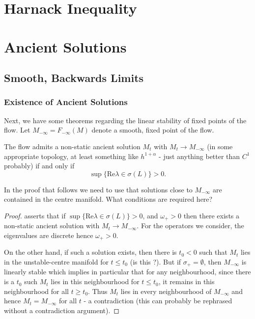 \documentclass{amsart}
\begin{document}
\section{Harnack Inequality}
\label{sec:harnack}


\section{Ancient Solutions}
\label{sec:ancient_solutions}

\subsection{Smooth, Backwards Limits}
\label{subsec:smooth_backwards_limits}

\subsubsection{Existence of Ancient Solutions}
\label{subsubsec:smooth_ancient_existence}

Next, we have some theorems regarding the linear stability of fixed points of the flow. Let \(M_{-\infty} = F_{-\infty}(M)\) denote a smooth, fixed point of the flow.

\begin{thm}
The flow admits a non-static ancient solution \(M_t\) with \(M_t \to M_{-\infty}\) (in some appropriate topology, at least something like \(h^{1+\alpha}\) - just anything better than \(C^1\) probably) if and only if
\[
\sup \{\text{Re}\lambda \in \sigma(L)\} > 0.
\]
\end{thm}

\begin{rem}
In the proof that follows we need to use that solutions close to \(M_{-\infty}\) are contained in the centre manifold. What conditions are required here?
\end{rem}

\begin{proof}
\cite[Theorem 9.1.3]{lunardi2012analytic} asserts that if \(\sup \{\text{Re}\lambda \in \sigma(L)\} > 0\), and \(\omega_+ > 0\) then there exists a non-static ancient solution with \(M_t \to M_{-\infty}\). For the operators we consider, the eigenvalues are discrete hence \(\omega_+ > 0\).

On the other hand, if such a solution exists, then there is \(t_0 < 0\) such that \(M_t\) lies in the unstable-centre manifold for \(t \leq t_0\) (is this \cite[Theorem 9.1.4]{lunardi2012analytic}?). But if \(\sigma_+ = \emptyset\), then \(M_{-\infty}\) is linearly stable which implies in particular that for any neighbourhood, since there is a \(t_0\) such \(M_t\) lies in this neighbourhood for \(t \leq t_0\), it remains in this neighbourhood for all \(t \geq t_0\). Thus \(M_t\) lies in every neighbourhood of \(M_{-\infty}\) and hence \(M_t = M_{-\infty}\) for all \(t\) - a contradiction (this can probably be rephrased without a contradiction argument).

\end{proof}
\end{document}
